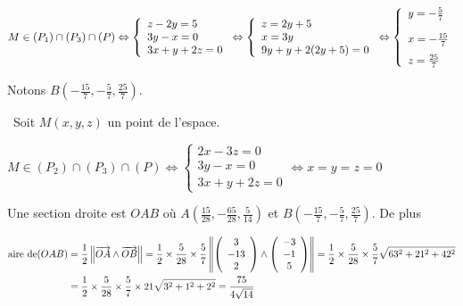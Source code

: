 {{\begin{center}
$M\in(P_1)\cap(P_3)\cap(P)\Leftrightarrow
\left\{
\begin{array}{l}
z-2y=5\\
3y-x=0\\
3x+y+2z=0
\end{array}
\right.\Leftrightarrow\left\{
\begin{array}{l}
z=2y+5\\
x=3y\\
9y+y+2(2y+5)=0
\end{array}
\right.\Leftrightarrow\left\{
\begin{array}{l}
y=-\frac{5}{7}\\
x=-\frac{15}{7}\rule[-4mm]{0mm}{11mm}\\
z=\frac{25}{7}
\end{array}
\right.$
\end{center}
Notons $B\left(-\frac{15}{7},-\frac{5}{7},\frac{25}{7}\right)$.

\textbullet~Soit $M(x,y,z)$ un point de l'espace.

\begin{center}
$M\in(P_2)\cap(P_3)\cap(P)\Leftrightarrow
\left\{
\begin{array}{l}
2x-3z=0\\
3y-x=0\\
3x+y+2z=0
\end{array}
\right.\Leftrightarrow x=y=z=0$
\end{center}
Une section droite est $OAB$ où $A\left(\frac{15}{28},-\frac{65}{28},\frac{5}{14}\right)$ et $B\left(-\frac{15}{7},-\frac{5}{7},\frac{25}{7}\right)$. De plus

\begin{align*}\ensuremath
\text{aire de}(OAB)&=\frac{1}{2}\left\|\overrightarrow{OA}\wedge\overrightarrow{OB}\right\|=\frac{1}{2}\times\frac{5}{28}\times\frac{5}{7}\left\|\left(
\begin{array}{c}
3\\
-13\\
2
\end{array}\right)
\wedge
\left(
\begin{array}{c}
-3\\
-1\\
5
\end{array}\right)\right\|=\frac{1}{2}\times\frac{5}{28}\times\frac{5}{7}\sqrt{63^2+21^2+42^2}\\
 &=\frac{1}{2}\times\frac{5}{28}\times\frac{5}{7}\times21\sqrt{3^2+1^2+2^2}=\frac{75}{4\sqrt{14}}
\end{align*}
\begin{center}
\end{center}
}
}
